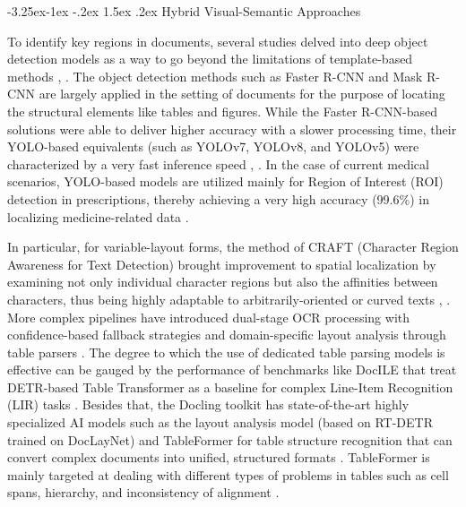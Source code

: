 \documentclass[conference,twocolumn]{IEEEtran}
\makeatletter
\renewcommand{\subsection}{\@startsection{subsection}{2}{\z@}%
  {-3.25ex\@plus -1ex \@minus -.2ex}%
  {1.5ex \@plus .2ex}%
  {\normalfont\normalsize\bfseries\itshape}}
\makeatother
\begin{document}
\subsection{Hybrid Visual-Semantic Approaches}

To identify key regions in documents, several studies delved into deep
object detection models as a way to go beyond the limitations of
template-based methods \cite{ref9}, \cite{ref12}. The object detection methods
such as Faster R-CNN \cite{ref13} and Mask R-CNN \cite{ref14} are largely
applied in the setting of documents for the purpose of locating the
structural elements like tables and figures. While the Faster
R-CNN-based solutions were able to deliver higher accuracy with a slower
processing time, their YOLO-based equivalents (such as YOLOv7, YOLOv8,
and YOLOv5) were characterized by a very fast inference speed \cite{ref6},
\cite{ref15}. In the case of current medical scenarios, YOLO-based models
are utilized mainly for Region of Interest (ROI) detection in
prescriptions, thereby achieving a very high accuracy (99.6\%) in
localizing medicine-related data \cite{ref6}.

In particular, for variable-layout forms, the method of CRAFT (Character
Region Awareness for Text Detection) brought improvement to spatial
localization by examining not only individual character regions but also
the affinities between characters, thus being highly adaptable to
arbitrarily-oriented or curved texts \cite{ref5}, \cite{ref7}. More complex
pipelines have introduced dual-stage OCR processing with
confidence-based fallback strategies and domain-specific layout analysis
through table parsers \cite{ref9}. The degree to which the use of dedicated
table parsing models is effective can be gauged by the performance of
benchmarks like DocILE that treat DETR-based Table Transformer as a
baseline for complex Line-Item Recognition (LIR) tasks \cite{ref2}. Besides
that, the Docling toolkit has state-of-the-art highly specialized AI
models such as the layout analysis model (based on RT-DETR trained on
DocLayNet) and TableFormer for table structure recognition that can
convert complex documents into unified, structured formats \cite{ref16}.
TableFormer is mainly targeted at dealing with different types of
problems in tables such as cell spans, hierarchy, and inconsistency of
alignment \cite{ref16}.
\end{document}
